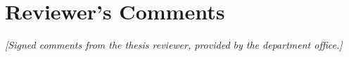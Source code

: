 \chapter*{Reviewer's Comments}
\label{reviewer-comments}

\textit{[Signed comments from the thesis reviewer, provided by the
department office.]}
